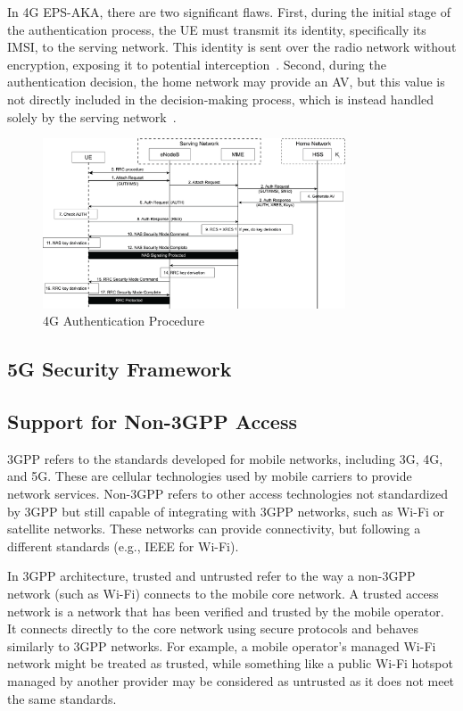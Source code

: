 In \ac{4G} \ac{EPS-AKA}, there are two significant flaws. First, during the initial stage of the authentication process, the \ac{UE} must transmit its identity, specifically its \ac{IMSI}, to the serving network. This identity is sent over the radio network without encryption, exposing it to potential interception~\cite{cbl-comp-4g-5g-p3}. Second, during the authentication decision, the home network may provide an \ac{AV}, but this value is not directly included in the decision-making process, which is instead handled solely by the serving network~\cite{cbl-comp-4g-5g-p4}.

\begin{figure}[htbp]
    \centering
    \includegraphics[width=0.8\textwidth]{figs/4g-authentication-flow.png}
    \caption{\ac{4G} Authentication Procedure}
    \label{fig:single}
\end{figure}

\subsection{\ac{5G} Security Framework}

\subsection{Support for Non-3GPP Access}

\ac{3GPP} refers to the standards developed for mobile networks, including \ac{3G}, \ac{4G}, and \ac{5G}. These are cellular technologies used by mobile carriers to provide network services. Non-\ac{3GPP} refers to other access technologies not standardized by \ac{3GPP} but still capable of integrating with \ac{3GPP} networks, such as Wi-Fi or satellite networks. These networks can provide connectivity, but following a different standards (e.g., IEEE for Wi-Fi).

In \ac{3GPP} architecture, trusted and untrusted refer to the way a non-\ac{3GPP} network (such as Wi-Fi) connects to the mobile core network. A trusted access network is a network that has been verified and trusted by the mobile operator. It connects directly to the core network using secure protocols and behaves similarly to \ac{3GPP} networks. For example, a mobile operator’s managed Wi-Fi network might be treated as trusted, while something like a public Wi-Fi hotspot managed by another provider may be considered as untrusted as it does not meet the same standards.

